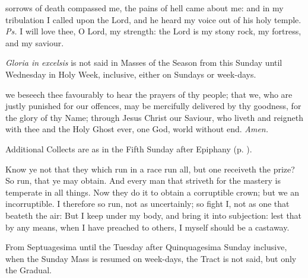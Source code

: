 \introit
{} sorrows of death compassed me, the pains of hell came about me: and in my tribulation I called upon the Lord, and he heard my voice out of his holy temple. \textit{Ps.} I will love thee, O Lord, my strength: the Lord is my stony rock, my fortress, and my saviour.
\begin{rubric}
    \emph{Gloria in excelsis} is not said in Masses of the Season from this Sunday until Wednesday in Holy Week, inclusive, either on Sundays or week-days.
\end{rubric}
\collect
{} we beseech thee favourably to hear the prayers of thy people; that we, who are justly punished for our offences, may be mercifully delivered by thy goodness, for the glory of thy Name; through Jesus Christ our Saviour, who liveth and reigneth with thee and the Holy Ghost ever, one God, world without end. \textit{Amen.}
\begin{rubric}
    Additional Collects are as in the Fifth Sunday after Epiphany (p. \pageref{EpiphanyV}).
\end{rubric}
 Know ye not that they which run in a race run all, but one receiveth the prize? So run, that ye may obtain. And every man that striveth for the mastery is temperate in all things. Now they do it to obtain a corruptible crown; but we an incorruptible. I therefore so run, not as uncertainly; so fight I, not as one that beateth the air: But I keep under my body, and bring it into subjection: lest that by any means, when I have preached to others, I myself should be a castaway.

\begin{rubric}
    From Septuagesima until the Tuesday after Quinquagesima Sunday inclusive, when the Sunday Mass is resumed on week-days, the Tract is not said, but only the Gradual.
\end{rubric}

